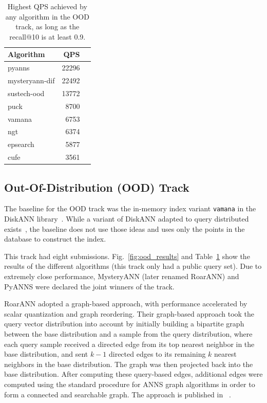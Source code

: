 \begin{table}
\centering
\begin{tabular}{lrr}
\hline
Algorithm & QPS \\
\hline
pyanns &  22296 \\
mysteryann-dif & 22492 \\
sustech-ood  & 13772\\
puck & 8700 \\ 
vamana & 6753 \\
ngt &  6374 \\
epsearch & 5877 \\
cufe &  3561 \\
\hline
\end{tabular}
\caption{Highest QPS achieved by any algorithm in the OOD track, as long as the recall@10 is at least 0.9.}\label{tab:ood}
\end{table}

\fi 

\subsection{Out-Of-Distribution (OOD) Track}
The baseline for the OOD track was the in-memory index variant \texttt{vamana} in the DiskANN library~\cite{Diskann-v0.5}. 
%
While a variant of DiskANN adapted to query distributed exists~\cite{jaiswal2022ooddiskann},
the baseline does not use those ideas and %
%
uses only the points in the database to construct the index.
%


This track had eight submissions. Fig.~\ref{fig:ood_results} and Table~\ref{tab:ood} show the results of the different algorithms  (this track only had a public query set). Due to extremely close performance, MysteryANN (later renamed RoarANN) and PyANNS were declared the joint winners of the track. 

RoarANN adopted a graph-based approach, with performance accelerated by scalar quantization and graph reordering. Their graph-based approach took the query vector distribution into account by initially building a bipartite graph between the base distribution and a sample from the query distribution, where each query sample received a directed edge from its top nearest neighbor in the base distribution, and sent $k-1$ directed edges to its remaining $k$ nearest neighbors in the base distribution. The graph was then projected back into the base distribution. After computing these query-based edges, additional edges were computed using the standard procedure for ANNS graph algorithms in order to form a connected and searchable graph. The approach is published in ~\cite{DBLP:journals/pvldb/ChenZHJW24}.

